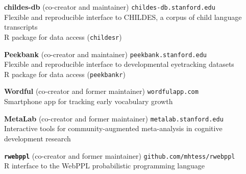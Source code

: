 \documentclass[11pt,]{article}
\begin{document}
\textbf{childes-db} (co-creator and maintainer)
\hfill \texttt{childes-db.stanford.edu}\\
\hspace*{0.333em}\hspace*{0.333em}\hspace*{0.333em}Flexible and
reproducible interface to CHILDES, a corpus of child language
transcripts \\
\hspace*{0.333em}\hspace*{0.333em}\hspace*{0.333em}R package for data
access (\texttt{childesr})

\textbf{Peekbank} (co-creator and maintainer)
\hfill \texttt{peekbank.stanford.edu}\\
\hspace*{0.333em}\hspace*{0.333em}\hspace*{0.333em}Flexible and
reproducible interface to developmental eyetracking datasets \\
\hspace*{0.333em}\hspace*{0.333em}\hspace*{0.333em}R package for data
access (\texttt{peekbankr})

\textbf{Wordful} (co-creator and former maintainer)
\hfill \texttt{wordfulapp.com}\\
\hspace*{0.333em}\hspace*{0.333em}\hspace*{0.333em}Smartphone app for
tracking early vocabulary growth

\textbf{MetaLab} (co-creator and former maintainer)
\hfill \texttt{metalab.stanford.edu}\\
\hspace*{0.333em}\hspace*{0.333em}\hspace*{0.333em}Interactive tools for
community-augmented meta-analysis in cognitive development research

\textbf{\texttt{rwebppl}} (co-creator and former maintainer)
\hfill \texttt{github.com/mhtess/rwebppl}\\
\hspace*{0.333em}\hspace*{0.333em}\hspace*{0.333em}R interface to the
WebPPL probabilistic programming language
\end{document}
